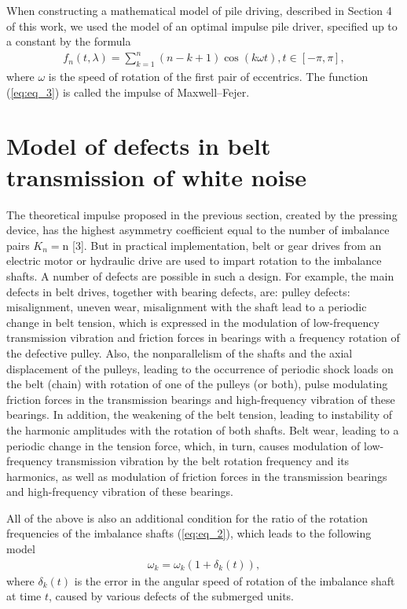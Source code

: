 \documentclass[
11pt,%
tightenlines,%
twoside,%
onecolumn,%
nofloats,%
nobibnotes,%
nofootinbib,%
superscriptaddress,%
noshowpacs,%
centertags]%
{revtex4}
\begin{document}
When constructing a mathematical model  of pile driving, described
in Section 4 of this work, we used the model of an optimal impulse
pile driver, specified up to a constant by the formula
\begin{eqnarray}
f_{n}(t, \lambda)=\sum_{k=1}^{n}(n-k+1) \cos (k \omega t), t \in[-\pi, \pi], \label{eq:eq_3}
\end{eqnarray}
where $\omega$ is the speed of rotation  of the first pair of
eccentrics. The function (\ref{eq:eq_3}) is called the impulse of
Maxwell--Fejer.

\section{Model of defects in belt transmission of white noise}
The theoretical impulse proposed in the previous section,  created
by the pressing device, has the highest asymmetry coefficient equal
to the number of imbalance pairs $K_{n}=\mathrm{n}$ [3]. But in
practical implementation, belt or gear drives from an electric motor
or hydraulic drive are used to impart rotation to the imbalance
shafts. A number of defects are possible in such a design. For
example, the main defects in belt drives, together with bearing
defects, are: pulley defects: misalignment, uneven wear,
misalignment with the shaft lead to a periodic change in belt
tension, which is expressed in the modulation of low-frequency
transmission vibration and friction forces in bearings with a
frequency rotation of the defective pulley. Also, the nonparallelism
of the shafts and the axial displacement of the pulleys, leading to
the occurrence of periodic shock loads on the belt (chain) with
rotation of one of the pulleys (or both), pulse modulating friction
forces in the transmission bearings and high-frequency vibration of
these bearings. In addition, the weakening of the belt tension,
leading to instability of the harmonic amplitudes with the rotation
of both shafts. Belt wear, leading to a periodic change in the
tension force, which, in turn, causes modulation of low-frequency
transmission vibration by the belt rotation frequency and its
harmonics, as well as modulation of friction forces in the
transmission bearings and high-frequency vibration of these
bearings.

All of the above is also an additional  condition for the ratio of
the rotation frequencies of the imbalance shafts (\ref{eq:eq_2}),
which leads to the following model
\begin{eqnarray*}
\omega_{k}=\omega_{k}\left(1+\delta_{k}(t)\right),
\end{eqnarray*}
where $\delta_{k}(t)$ is the error in the angular speed  of rotation
of the imbalance shaft at time $t$, caused by various defects of the
submerged units.
\end{document}
